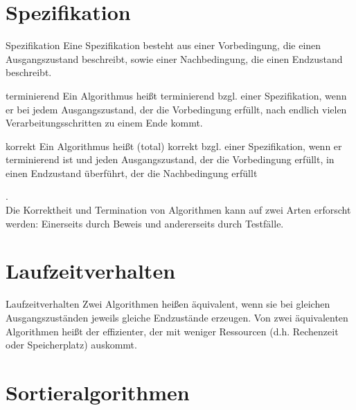\section{Spezifikation}
\begin{zitat}{Spezifikation}
 Eine Spezifikation besteht aus einer Vorbedingung, die einen Ausgangszustand beschreibt, sowie einer Nachbedingung, die einen Endzustand beschreibt.
\end{zitat}
\begin{zitat}{terminierend}
 Ein Algorithmus heißt terminierend bzgl. einer Spezifikation, wenn er bei jedem Ausgangszustand, der die Vorbedingung erfüllt, nach endlich vielen Verarbeitungsschritten zu einem Ende kommt.
\end{zitat}
\begin{zitat}{korrekt}
Ein Algorithmus heißt (total) korrekt bzgl. einer Spezifikation, wenn er terminierend ist und jeden Ausgangszustand, der die Vorbedingung erfüllt, in einen Endzustand überführt, der die Nachbedingung erfüllt
\end{zitat}
.\\
Die Korrektheit und Termination von Algorithmen kann auf zwei Arten erforscht werden:
Einerseits durch Beweis und andererseits durch Testfälle.

\section{Laufzeitverhalten}
\begin{zitat}{Laufzeitverhalten}
 Zwei Algorithmen heißen äquivalent, wenn sie bei gleichen Ausgangszuständen jeweils gleiche Endzustände erzeugen. Von zwei äquivalenten Algorithmen heißt der effizienter, der mit weniger Ressourcen (d.h. Rechenzeit oder Speicherplatz) auskommt.
\end{zitat}


\newpage
\section{Sortieralgorithmen}
